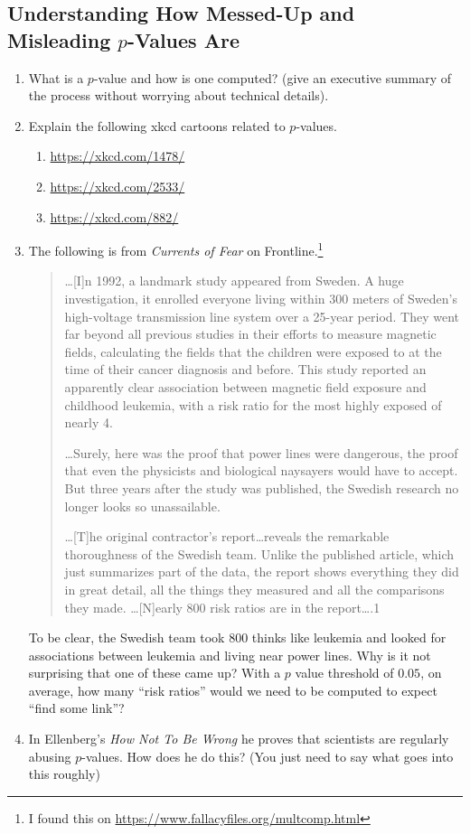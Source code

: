 \documentclass[11pt, letterpaper]{article}
\begin{document}
\subsection{Understanding How Messed-Up and Misleading $p$-Values Are}
\begin{enumerate}
	\item What is a $p$-value and how is one computed? (give an executive summary of the process without worrying about technical details).
     \item Explain the following xkcd cartoons related to $p$-values.
     \begin{enumerate}
     	\item \url{https://xkcd.com/1478/}
     	\item \url{https://xkcd.com/2533/}
     	\item \url{https://xkcd.com/882/}
     \end{enumerate}
    \item 
    The following is from \emph{Currents of Fear} on Frontline.\footnote{I found this on \url{https://www.fallacyfiles.org/multcomp.html}}
    \begin{quote}
    	…[I]n 1992, a landmark study appeared from Sweden. A huge investigation, it enrolled everyone living within 300 meters of Sweden's high-voltage transmission line system over a 25-year period. They went far beyond all previous studies in their efforts to measure magnetic fields, calculating the fields that the children were exposed to at the time of their cancer diagnosis and before. This study reported an apparently clear association between magnetic field exposure and childhood leukemia, with a risk ratio for the most highly exposed of nearly 4.
    	
    	…Surely, here was the proof that power lines were dangerous, the proof that even the physicists and biological naysayers would have to accept. But three years after the study was published, the Swedish research no longer looks so unassailable. 
    	
    	…[T]he original contractor's report…reveals the remarkable thoroughness of the Swedish team. Unlike the published article, which just summarizes part of the data, the report shows everything they did in great detail, all the things they measured and all the comparisons they made. …[N]early 800 risk ratios are in the report….1
    \end{quote}
To be clear, the Swedish team took 800 thinks like leukemia and looked for associations between leukemia and living near power lines. 
Why is it not surprising that one of these came up?
With a $p$ value threshold of $0.05$, on average, how many ``risk ratios'' would we need to be computed to expect ``find some link''?
    \item In Ellenberg's \emph{How Not To Be Wrong} he proves that scientists are regularly abusing $p$-values. How does he do this? (You just need to say what goes into this roughly)
\end{enumerate}
\end{document}
